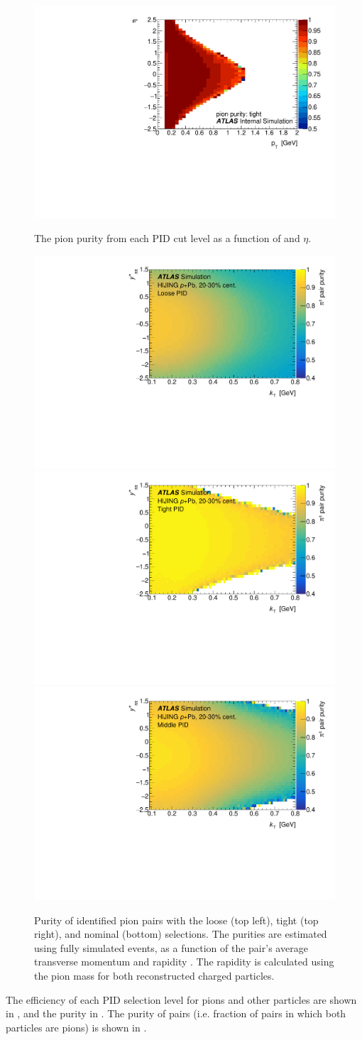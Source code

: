 \begin{figure}[t]
\begin{minipage}[t]{1.0\textwidth}
\includegraphics[width=.49\linewidth]{pid_pur_tight.pdf}\\
\end{minipage}
\caption{The pion purity from each PID cut level as a function of \pt and $\eta$.}
\label{fig:pid_purity_2d}
\end{figure}


\begin{figure}[t]
\centering
\includegraphics[width=.49\linewidth]{pid_pur_loose_kt_eta.pdf}
\includegraphics[width=.49\linewidth]{pid_pur_tight_kt_eta.pdf}\\
\includegraphics[width=.6\linewidth]{pid_pur_mid_kt_eta.pdf}\\
\caption{Purity of identified pion pairs with the loose (top left), tight (top right), and nominal (bottom) \pid selections. The purities are estimated using fully simulated \Hijing \pPb events, as a function of the pair's average transverse momentum \kt and rapidity \kys. The rapidity is calculated using the pion mass for both reconstructed charged particles.}
\label{fig:pid_purity_kt_eta}
\end{figure}

The efficiency of each PID selection level for pions and other particles are shown in , and the purity in .
The purity of pairs (i.e. fraction of pairs in which both particles are pions) is shown in .

